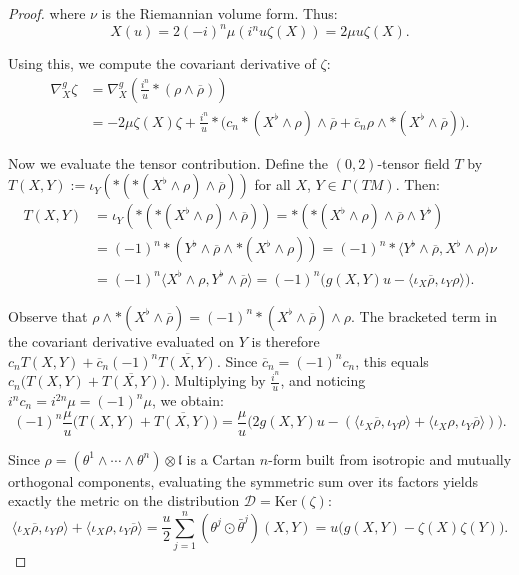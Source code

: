 \documentclass[10pt,a4paper,twoside,reqno]{amsart}
\theoremstyle{plain}
\theoremstyle{definition}
\theoremstyle{remark}
\newcommand{\escal}[1]{\langle#1\rangle}
\renewcommand{\ker}{\mathrm{Ker}}
\begin{document}
\begin{proof}
\noindent
where $\nu$ is the Riemannian volume form. Thus:
\begin{equation*}
X(u)=2(-i)^n\mu (i^n u\zeta(X))=2\mu u\zeta(X).
\end{equation*}

\noindent
Using this, we compute the covariant derivative of $\zeta$:
\begin{align*}
\nabla^{g}_X\zeta &= \nabla^{g}_X \left(\frac{i^n}{u} *(\rho\wedge\overline{\rho})\right)\\ 
&= -2\mu\zeta(X)\zeta+\frac{i^n}{u}*\big(c_n*(X^\flat\wedge\rho)\wedge\overline{\rho} + \overline{c}_n\rho\wedge *(X^\flat\wedge\overline{\rho})\big).
\end{align*}

\noindent
Now we evaluate the tensor contribution. Define the $(0,2)$-tensor field $T$ by $T(X,Y):=\iota_Y(*(*(X^\flat\wedge\rho)\wedge\overline{\rho}))$ for all $X$, $Y\in\Gamma(TM)$. Then:
\begin{align*}
    T(X,Y)&=\iota_Y(*(*(X^\flat\wedge\rho)\wedge\overline{\rho}))=*(*(X^\flat\wedge\rho)\wedge\overline{\rho}\wedge Y^\flat)\\
    &=(-1)^n*(Y^\flat\wedge\overline{\rho}\wedge*(X^\flat\wedge\rho))=(-1)^n*\escal{Y^\flat\wedge\overline{\rho},X^\flat\wedge\rho}\nu\\
    &=(-1)^n\escal{X^\flat\wedge\rho,Y^\flat\wedge\overline{\rho}}=(-1)^n\big(g(X,Y)u-\escal{\iota_X\overline{\rho},\iota_Y\rho}\big).
\end{align*}

\noindent
Observe that $\rho \wedge \ast(X^\flat \wedge \overline{\rho}) = (-1)^n \ast(X^\flat \wedge \overline{\rho}) \wedge \rho$. The bracketed term in the covariant derivative evaluated on $Y$ is therefore $c_n T(X,Y) + \overline{c}_n (-1)^n \overline{T(X,Y)}$. Since $\overline{c}_n=(-1)^nc_n$, this equals $c_n \big(T(X,Y) + \overline{T(X,Y)}\big)$. Multiplying by $\frac{i^n}{u}$, and noticing $i^n c_n = i^{2n}\mu = (-1)^n\mu$, we obtain:
\begin{equation*}
(-1)^n\frac{\mu}{u} \big(T(X,Y) + \overline{T(X,Y)}\big) = \frac{\mu}{u} \big(2g(X,Y)u - (\escal{\iota_X\overline{\rho},\iota_Y\rho} + \escal{\iota_X\rho,\iota_Y\overline{\rho}})\big).
\end{equation*}

\noindent
Since $\rho = (\theta^1\wedge \cdots \wedge \theta^n) \otimes \mathfrak{l}$ is a Cartan $n$-form built from isotropic and mutually orthogonal components, evaluating the symmetric sum over its factors yields exactly the metric on the distribution $\mathcal{D}=\ker(\zeta)$:
\begin{equation*}
\escal{\iota_X\overline{\rho},\iota_Y\rho} + \escal{\iota_X\rho,\iota_Y\overline{\rho}} = \frac{u}{2}\sum_{j=1}^n(\theta^j\odot\bar{\theta}^j)(X,Y) = u\big(g(X,Y)-\zeta(X)\zeta(Y)\big).
\end{equation*}


\end{proof}
\end{document}
